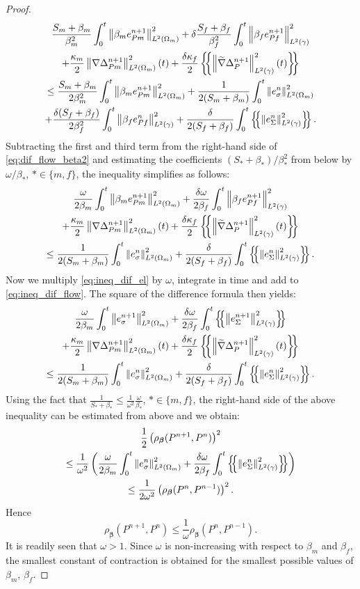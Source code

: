 \documentclass[a4paper]{article}
\numberwithin{equation}{section}
\def\agrad{\widetilde\nabla}
\def\avg#1{\left\{\mskip-5mu\left\{#1\right\}\mskip-5mu\right\}}
\def\bbeta{\boldsymbol{\beta}}
\def\norm#1{\left\|#1\right\|}
\newcommand{\eqs}[1]{\begin{equation*}#1\end{equation*}}
\newcommand{\ml}[1]{\begin{multline}#1\end{multline}}
\newcommand{\mls}[1]{\begin{multline*}#1\end{multline*}}
\begin{document}
\begin{proof}
\ml{ 
    \label{eq:dif_flow_beta2}
    \frac{S_m+\beta_m}{\beta_m^2}\int_0^t\norm{\beta_m e_{Pm}^{n+1}}_{L^2(\Omega_m)}^2 
    + \delta\frac{S_f+\beta_f}{\beta_f^2}\int_0^t\norm{\beta_f e_{Pf}^{n+1}}_{L^2(\gamma)}^2\\
    + \frac{\kappa_m}2\norm{\nabla\Delta_{Pm}^{n+1}}_{L^2(\Omega_m)}^2(t) 
    + \frac{\delta\kappa_f}2\avg{\norm{\agrad\Delta_P^{n+1}}_{L^2(\gamma)}^2(t)}\\
    \le \frac{S_m+\beta_m}{2\beta_m^2}\int_0^t\norm{\beta_m e_{Pm}^{n+1}}_{L^2(\Omega_m)}^2 
    + \frac1{2(S_m+\beta_m)}\int_0^t\norm{e_\sigma^n}_{L^2(\Omega_m)}^2\\
    + \frac{\delta(S_f+\beta_f)}{2\beta_f^2}\int_0^t\norm{\beta_f e_{Pf}^n}_{L^2(\gamma)}^2 
    + \frac\delta{2(S_f+\beta_f)}\int_0^t\avg{\norm{e_\Sigma^n}_{L^2(\gamma)}^2}. 
}
%
Subtracting the first and third term from the right-hand side of \eqref{eq:dif_flow_beta2} and estimating the coefficients $(S_*+\beta_*)/\beta_*^2$ from below by $\omega/\beta_*$, $*\in\{m,f\}$, the inequality simplifies as follows:
\ml{
    \label{eq:ineq_dif_flow} 
    \frac\omega{2\beta_m}\int_0^t\norm{\beta_m e_{Pm}^{n+1}}_{L^2(\Omega_m)}^2 
    + \frac{\delta\omega}{2\beta_f}\int_0^t\norm{\beta_f e_{Pf}^{n+1}}_{L^2(\gamma)}^2\\
    + \frac{\kappa_m}2\norm{\nabla\Delta_{Pm}^{n+1}}_{L^2(\Omega_m)}^2(t) 
    + \frac{\delta\kappa_f}2\avg{\norm{\agrad\Delta_P^{n+1}}_{L^2(\gamma)}^2(t)}\\
    \le \frac1{2(S_m+\beta_m)}\int_0^t\norm{e_\sigma^n}_{L^2(\Omega_m)}^2
    + \frac\delta{2(S_f+\beta_f)}\int_0^t\avg{\norm{e_\Sigma^n}_{L^2(\gamma)}^2}. 
}
Now we multiply \eqref{eq:ineq_dif_el} by $\omega$, integrate in time and add to \eqref{eq:ineq_dif_flow}.
The square of the difference formula then yields:
\mls{
    \frac\omega{2\beta_m}\int_0^t\norm{e_\sigma^{n+1}}_{L^2(\Omega_m)}^2 
    + \frac{\delta\omega}{2\beta_f}\int_0^t\avg{\norm{e_\Sigma^{n+1}}_{L^2(\gamma)}^2}\\
    + \frac{\kappa_m}2\norm{\nabla\Delta_{Pm}^{n+1}}_{L^2(\Omega_m)}^2(t) 
    + \frac{\delta\kappa_f}2\avg{\norm{\agrad\Delta_P^{n+1}}_{L^2(\gamma)}^2(t)}\\
    \le \frac1{2(S_m+\beta_m)}\int_0^t\norm{e_\sigma^n}_{L^2(\Omega_m)}^2
    + \frac\delta{2(S_f+\beta_f)}\int_0^t\avg{\norm{e_\Sigma^n}_{L^2(\gamma)}^2}. 
}
%
Using the fact that $\frac1{S_*+\beta_*}\le\frac1{\omega^2}\frac{\omega}{\beta_*}$, $*\in\{m,f\}$, the right-hand side of the above inequality can be estimated from above and we obtain:
\mls{ \frac12\left(\rho_{\bbeta}(P^{n+1},P^n)\right)^2\\
\le \frac1{\omega^2}\left(\frac\omega{2\beta_m}\int_0^t\norm{e_\sigma^n}_{L^2(\Omega_m)}^2
+ \frac{\delta\omega}{2\beta_f}\int_0^t\avg{\norm{e_\Sigma^n}_{L^2(\gamma)}^2}\right)\\
\le \frac1{2\omega^2}\left(\rho_{\bbeta}(P^n,P^{n-1})\right)^2. }
Hence
\eqs{ \rho_{\bbeta}(P^{n+1},P^n) \le \frac1\omega \rho_{\bbeta}(P^n,P^{n-1}). }
It is readily seen that $\omega>1$.
Since $\omega$ is non-increasing with respect to $\beta_m$ and $\beta_f$, the smallest constant of contraction is obtained for the smallest possible values of $\beta_m$, $\beta_f$.
\end{proof}
\end{document}
